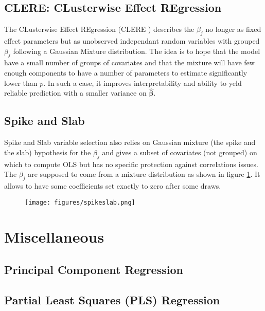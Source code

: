 \documentclass[12pt,a4paper]{report}
\begin{document}
		\subsection{CLERE: CLusterwise Effect REgression}		%

			The CLusterwise Effect REgression (\textsc{CLERE} \cite{yengo2012variable}) describes the $\beta_j$ no longer as fixed effect parameters but as unobserved independant random variables with grouped $\beta_j$ following a Gaussian Mixture distribution. The idea is to hope that the model have a small number of groups of covariates and that the mixture will have few enough components to have a number of parameters to estimate significantly lower than $p$. In such a case, it improves interpretability and ability to yeld reliable prediction with a smaller variance on $\boldsymbol{\hat{\beta}}$. 
	
		\subsection{Spike and Slab}			%

			Spike and Slab variable selection \cite{ishwaran2005spike} also relies on Gaussian mixture (the spike and the slab) hypothesis for the $\beta_j$ and gives a subset of covariates (not grouped) on which to compute \textsc{OLS} but has no specific protection against correlations issues.  The $\beta_j$ are supposed to come from a mixture distribution as shown in figure \ref{spikeslab}. It allows to have some coefficients set exactly to zero after some draws. 
			
\begin{figure}[h!]
	\centering
	\texttt{[image: figures/spikeslab.png]} 
	\caption{}\label{spikeslab}
\end{figure}		
			
	\section{Miscellaneous}	
	\subsection{Principal Component Regression}
	\cite{jackson2005user}
	\subsection{Partial Least Squares (PLS) Regression}
	\cite{abdi2003partial,geladi1986partial}
\end{document}
